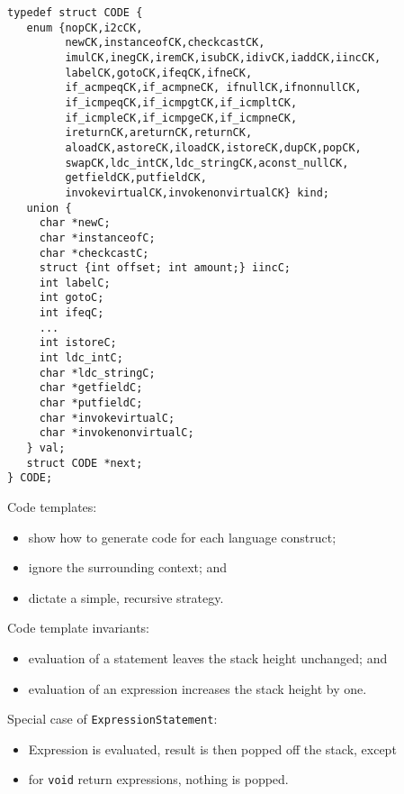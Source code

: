 \begin{slide*}
\begin{scriptsize}
\begin{verbatim}
typedef struct CODE {
   enum {nopCK,i2cCK,
         newCK,instanceofCK,checkcastCK,
         imulCK,inegCK,iremCK,isubCK,idivCK,iaddCK,iincCK,
         labelCK,gotoCK,ifeqCK,ifneCK,
         if_acmpeqCK,if_acmpneCK, ifnullCK,ifnonnullCK,
         if_icmpeqCK,if_icmpgtCK,if_icmpltCK,
         if_icmpleCK,if_icmpgeCK,if_icmpneCK,
         ireturnCK,areturnCK,returnCK,
         aloadCK,astoreCK,iloadCK,istoreCK,dupCK,popCK,
         swapCK,ldc_intCK,ldc_stringCK,aconst_nullCK,
         getfieldCK,putfieldCK,
         invokevirtualCK,invokenonvirtualCK} kind;
   union {
     char *newC;
     char *instanceofC;
     char *checkcastC;
     struct {int offset; int amount;} iincC;
     int labelC;
     int gotoC;
     int ifeqC;
     ...
     int istoreC;
     int ldc_intC;
     char *ldc_stringC;
     char *getfieldC;
     char *putfieldC;
     char *invokevirtualC;
     char *invokenonvirtualC;
   } val;
   struct CODE *next;
} CODE;
\end{verbatim}
\end{scriptsize}
\vfil
\end{slide*}

\begin{slide*}
Code templates:

\begin{itemize}
\item show how to generate code for each language construct;
\item ignore the surrounding context; and
\item dictate a simple, recursive strategy.
\end{itemize}
\vspace*{2ex}

Code template invariants:

\begin{itemize}
\item evaluation of a statement leaves the stack height unchanged; and
\item evaluation of an expression increases the stack height by
one.
\end{itemize}

Special case of \verb$ExpressionStatement$:
 
\begin{itemize} 
\item Expression is evaluated, result is then popped off the stack, except
\item for \verb$void$ return expressions, nothing is popped.
\end{itemize}
\vfil
\end{slide*}


